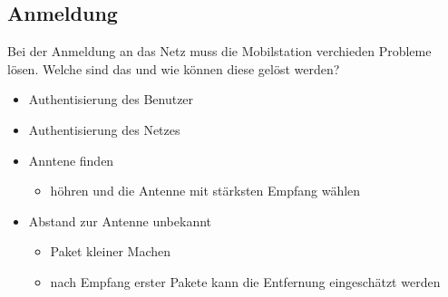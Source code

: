 \subsection{Anmeldung}
Bei der Anmeldung an das Netz muss die Mobilstation verchieden Probleme lösen. Welche sind das und wie können diese gelöst werden? \\
\begin{itemize}
\item Authentisierung des Benutzer
\item Authentisierung des Netzes
\item Anntene finden
\begin{itemize}
\item höhren und die Antenne mit stärksten Empfang wählen
\end{itemize}
\item Abstand zur Antenne unbekannt
\begin{itemize}
\item Paket kleiner Machen
\item nach Empfang erster Pakete kann die Entfernung eingeschätzt werden
\end{itemize}
\end{itemize}